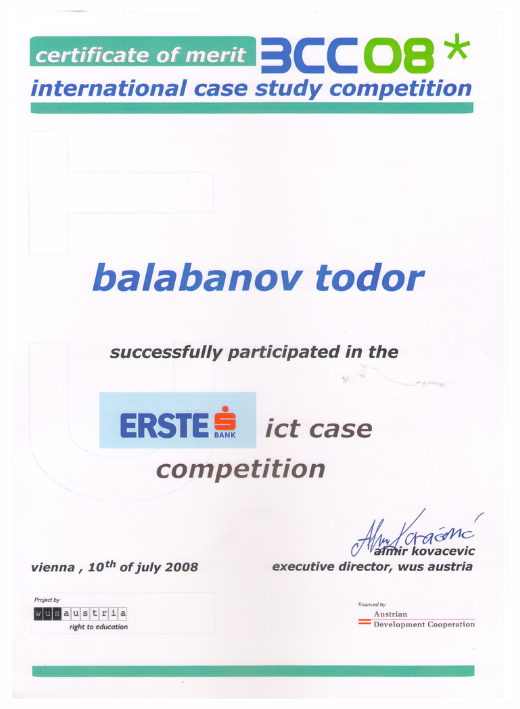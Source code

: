 \documentclass[english,a4paper]{europasscv}
\begin{document}
\includegraphics[width=\textwidth,height=\textheight,keepaspectratio]{BCC2008}
\end{document}
